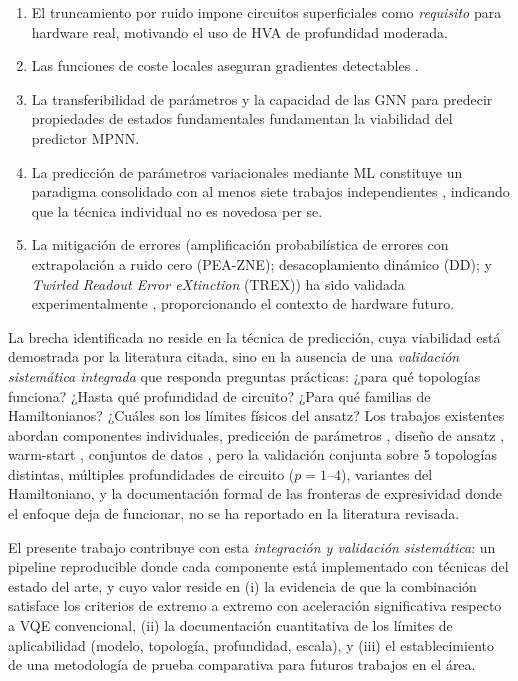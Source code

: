 \documentclass[11pt,a4paper,spanish]{book}
\begin{document}
\begin{enumerate}
    \item El truncamiento por ruido \citep{mele2026} impone circuitos superficiales como \emph{requisito} para hardware real, motivando el uso de HVA de profundidad moderada.
    \item Las funciones de coste locales aseguran gradientes detectables \citep{cerezo2021}.
    \item La transferibilidad de parámetros \citep{mele2022, puig2025} y la capacidad de las GNN para predecir propiedades de estados fundamentales \citep{huang2022, zhang2025} fundamentan la viabilidad del predictor MPNN.
    \item La predicción de parámetros variacionales mediante ML constituye un paradigma consolidado con al menos siete trabajos independientes \citep{miao2024, zhang2025, zou2026, yang2024pvls, zhang2025vqezy, huang2025palqo, karim2025}, indicando que la técnica individual no es novedosa per se.
    \item La mitigación de errores (amplificación probabilística de errores con extrapolación a ruido cero (PEA-ZNE); desacoplamiento dinámico (DD); y \emph{Twirled Readout Error eXtinction} (TREX)) ha sido validada experimentalmente \citep{kim2023, ma2025}, proporcionando el contexto de hardware futuro.
\end{enumerate}

La brecha identificada no reside en la técnica de predicción, cuya viabilidad está demostrada por la literatura citada, sino en la ausencia de una \emph{validación sistemática integrada} que responda preguntas prácticas: ¿para qué topologías funciona? ¿Hasta qué profundidad de circuito? ¿Para qué familias de Hamiltonianos? ¿Cuáles son los límites físicos del ansatz? Los trabajos existentes abordan componentes individuales, predicción de parámetros \citep{miao2024, zhang2025, huang2025palqo}, diseño de ansatz \citep{wiersema2020, tripathi2026}, warm-start \citep{puig2025}, conjuntos de datos \citep{zhang2025vqezy}, pero la validación conjunta sobre 5 topologías distintas, múltiples profundidades de circuito ($p = 1$--$4$), variantes del Hamiltoniano, y la documentación formal de las fronteras de expresividad donde el enfoque deja de funcionar, no se ha reportado en la literatura revisada.

El presente trabajo contribuye con esta \emph{integración y validación sistemática}: un pipeline reproducible donde cada componente está implementado con técnicas del estado del arte, y cuyo valor reside en (i) la evidencia de que la combinación satisface los criterios de extremo a extremo con aceleración significativa respecto a VQE convencional, (ii) la documentación cuantitativa de los límites de aplicabilidad (modelo, topología, profundidad, escala), y (iii) el establecimiento de una metodología de prueba comparativa para futuros trabajos en el área.
\end{document}
